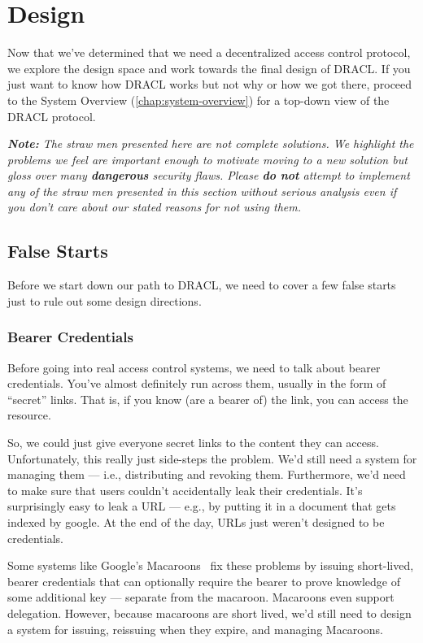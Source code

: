 \documentclass[pdftex,12pt,a4papaer,twoside,notitlepage]{report}
\newcommand{\note}[1]{\vspace{1em} \begin{spacing}{1}\textit{\textbf{Note:} #1}\end{spacing}\vspace{1em}}
\begin{document}
\section{Design}
\label{sec:design}

Now that we've determined that we need a decentralized access control protocol,
we explore the design space and work towards the final design of DRACL. If you
just want to know how DRACL works but not why or how we got there, proceed to
the System Overview (\cref{chap:system-overview}) for a top-down view of the
DRACL protocol.

\note{The straw men presented here are not complete solutions. We highlight the
  problems we feel are important enough to motivate moving to a new solution but
  gloss over many \textbf{dangerous} security flaws. Please \textbf{do not}
  attempt to implement any of the straw men presented in this section without
  serious analysis even if you don't care about our stated reasons for not using
  them.}

\subsection{False Starts}

Before we start down our path to DRACL, we need to cover a few false starts just
to rule out some design directions.

\subsubsection{Bearer Credentials}

Before going into real access control systems, we need to talk about bearer
credentials. You've almost definitely run across them, usually in the form of
``secret'' links. That is, if you know (are a bearer of) the link, you can
access the resource.

So, we could just give everyone secret links to the content they can access.
Unfortunately, this really just side-steps the problem. We'd still need a system
for managing them --- i.e., distributing and revoking them. Furthermore, we'd
need to make sure that users couldn't accidentally leak their credentials. It's
surprisingly easy to leak a URL --- e.g., by putting it in a document that gets
indexed by google. At the end of the day, URLs just weren't designed to be
credentials.

Some systems like Google's Macaroons~\cite{macaroon} fix these problems by
issuing short-lived, bearer credentials that can optionally require the bearer
to prove knowledge of some additional key --- separate from the macaroon.
Macaroons even support delegation. However, because macaroons are short lived,
we'd still need to design a system for issuing, reissuing when they expire,
and managing Macaroons.
\end{document}
